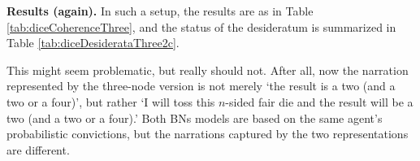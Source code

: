 \documentclass[
  10pt,
]{scrartcl}
\begin{document}
\textbf{Results (again).} In such a setup, the results are as in Table \ref{tab:diceCoherenceThree}, and the status of the desideratum is summarized in Table \ref{tab:diceDesiderataThree2c}.

\begin{table}[H]

\caption{\label{tab:diceCoherenceThree}Coherence scores for a regular die and a dodecahedron in the dice problem with three nodes (rounded).}
\centering
{}
\end{table}

\begin{table}[H]

\caption{\label{tab:diceDesiderataThree2c}Desideratum satisfaction for three-node BNs in the dice problem.}
\centering
{}
\end{table}

\noindent This might seem problematic, but really should not. After all, now the narration represented by the three-node version is not merely `the result is a two (and a two or a four)', but rather `I will toss this \(n\)-sided fair die and the result will be a two (and a two or a four).' Both BNs models are based on the same agent's probabilistic convictions, but the narrations captured by the two representations are different.
\end{document}
